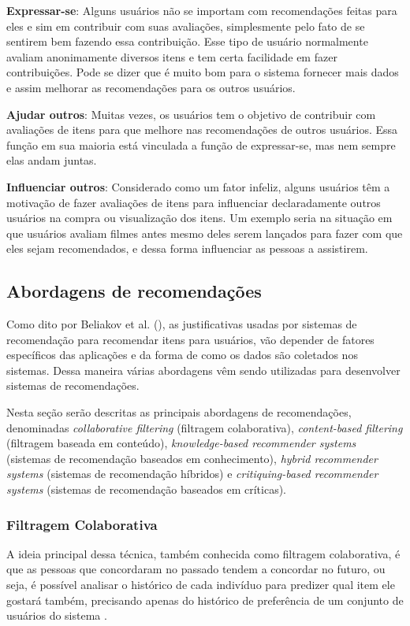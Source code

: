 \textbf{Expressar-se}: Alguns usuários não se importam com recomendações feitas para eles e sim em contribuir com suas avaliações, simplesmente pelo fato de se sentirem bem fazendo essa contribuição. Esse tipo de usuário normalmente avaliam anonimamente diversos itens e tem certa facilidade em fazer contribuições. Pode se dizer que é muito bom para o sistema fornecer mais dados e assim melhorar as recomendações para os outros usuários.

\textbf{Ajudar outros}: Muitas vezes, os usuários tem o objetivo de contribuir com avaliações de itens para que melhore nas recomendações de outros usuários. Essa função em sua maioria está vinculada a função de expressar-se, mas nem sempre elas andam juntas.

\textbf{Influenciar outros}: Considerado como um fator infeliz, alguns usuários têm a motivação de fazer avaliações de itens para influenciar declaradamente outros usuários na compra ou visualização dos itens. Um exemplo seria na situação em que usuários avaliam filmes antes mesmo deles serem lançados para fazer com que eles sejam recomendados,  e dessa forma influenciar as pessoas a assistirem.

\subsection{Abordagens de recomendações}

Como dito por Beliakov et al. (\citeyear{Beliakov:2011}), as justificativas usadas por sistemas de recomendação para recomendar itens para usuários, vão depender de fatores específicos  das aplicações e da forma de como os dados são coletados nos sistemas. Dessa maneira várias abordagens vêm sendo utilizadas para desenvolver sistemas de recomendações.

Nesta seção serão descritas as principais abordagens de recomendações, denominadas \textit{collaborative filtering} (filtragem colaborativa), \textit{content-based filtering} (filtragem baseada em conteúdo), \textit{knowledge-based recommender systems} (sistemas de recomendação baseados em conhecimento), \textit{hybrid recommender systems} (sistemas de recomendação híbridos) e \textit{critiquing-based recommender systems} (sistemas de recomendação baseados em críticas).

\subsubsection{Filtragem Colaborativa} 
\label{Collaborativefiltering}
A ideia principal dessa técnica, também conhecida como filtragem colaborativa, é que as pessoas que concordaram no passado tendem a concordar no futuro, ou seja, é possível analisar o histórico de cada indivíduo para predizer qual item ele gostará também, precisando apenas do histórico de preferência de um conjunto de usuários do sistema \cite{Nilashi:2013}.

